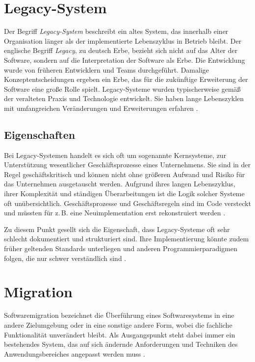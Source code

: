 \section{Legacy-System}
Der Begriff \textit{Legacy-System} beschreibt ein altes System, das innerhalb einer Organisation länger als der implementierte Lebenszyklus in Betrieb bleibt. Der englische Begriff \textit{Legacy}, zu deutsch Erbe, bezieht sich nicht auf das Alter der Software, sondern auf die Interpretation der Software als Erbe. Die Entwicklung wurde von früheren Entwicklern und Teams durchgeführt. Damalige Konzeptentscheidungen ergeben ein Erbe, das für die zukünftige Erweiterung der Software eine große Rolle spielt. Legacy-Systeme wurden typischerweise gemäß der veralteten Praxis und Technologie entwickelt. Sie haben lange Lebenszyklen mit umfangreichen Veränderungen und Erweiterungen erfahren \cite{sneed2016softwaremigration}.

\subsection{Eigenschaften}
Bei Legacy-Systemen handelt es sich oft um sogenannte Kernsysteme, zur Unterstützung wesentlicher Geschäftsprozesse eines Unternehmens. Sie sind in der Regel geschäftskritisch und können nicht ohne größeren Aufwand und Risiko für das Unternehmen ausgetauscht werden. Aufgrund ihres langen Lebenszyklus, ihrer Komplexität und ständigen Überarbeitungen ist die Logik solcher Systeme oft unübersichtlich. Geschäftsprozesse und Geschäftsregeln sind im Code versteckt und müssten für z.\,B. eine Neuimplementation erst rekonstruiert werden \cite{martens2016ablosung}.

Zu diesem Punkt gesellt sich die Eigenschaft, dass Legacy-Systeme oft sehr schlecht dokumentiert und strukturiert sind. Ihre Implementierung könnte zudem früher geltenden Standards unterliegen und anderen Programmierparadigmen folgen, die nur schwer verständlich sind \cite{stahlknecht2002einfuhrung}.

\section{Migration} \label{ssub:migration}
Softwaremigration bezeichnet die Überführung eines Softwaresystems in eine andere Zielumgebung oder in eine sonstige andere Form, wobei die fachliche Funktionalität unverändert bleibt. Als Ausgangspunkt steht dabei immer ein bestehendes System, das auf sich ändernde Anforderungen und Techniken des Anwendungsbereiches angepasst werden muss \cite{sneed2016softwaremigration}.

